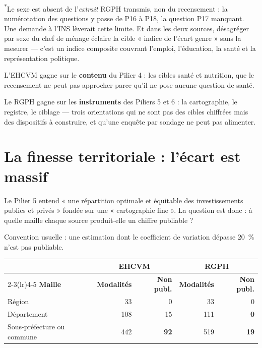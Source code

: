 \documentclass[11pt,a4paper]{article}
\begin{document}
\noindent\textsuperscript{*}\small{Le sexe est absent de l'\emph{extrait} RGPH transmis, non du
recensement : la numérotation des questions y passe de P16 à P18, la question P17 manquant. Une
demande à l'INS lèverait cette limite. Et dans les deux sources, désagréger par sexe du chef de
ménage éclaire la cible « indice de l'écart genre » sans la mesurer --- c'est un indice composite
couvrant l'emploi, l'éducation, la santé et la représentation politique.}

\begin{retenir}[Lecture]
L'EHCVM gagne sur le \textbf{contenu} du Pilier 4 : les cibles santé et nutrition, que le
recensement ne peut pas approcher parce qu'il ne pose aucune question de santé.

Le RGPH gagne sur les \textbf{instruments} des Piliers 5 et 6 : la cartographie, le registre, le
ciblage --- trois orientations qui ne sont pas des cibles chiffrées mais des dispositifs à
construire, et qu'une enquête par sondage ne peut pas alimenter.
\end{retenir}

\section{La finesse territoriale : l'écart est massif}

Le Pilier 5 entend « une répartition optimale et équitable des investissements publics et privés »
fondée sur une « cartographie fine ». La question est donc : à quelle maille chaque source
produit-elle un chiffre publiable ?

Convention usuelle : une estimation dont le coefficient de variation dépasse 20~\% n'est pas
publiable.

\begin{center}
\begin{tabular}{@{}lrrrr@{}}
\toprule
& \multicolumn{2}{c}{\textbf{EHCVM}} & \multicolumn{2}{c}{\textbf{RGPH}} \\
\cmidrule(lr){2-3}\cmidrule(lr){4-5}
\textbf{Maille} & \textbf{Modalités} & \textbf{Non publ.} & \textbf{Modalités} &
  \textbf{Non publ.} \\
\midrule
Région & 33 & 0 & 33 & 0 \\
Département & 108 & 15 & 111 & \textbf{0} \\
Sous-préfecture ou commune & 442 & \textbf{92} & 519 & \textbf{19} \\
\bottomrule
\end{tabular}
\end{center}
\end{document}

